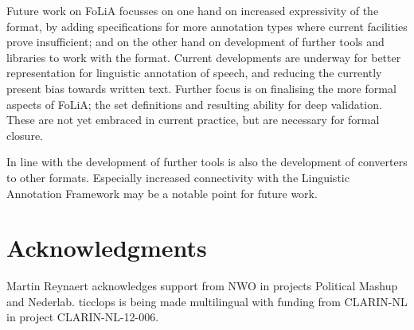 \documentclass[a4paper,10pt,twoside]{article}
\begin{document}
Future work on FoLiA focusses on one hand on increased expressivity of the
format, by adding specifications for more annotation types where current
facilities prove insufficient; and on the other hand on development of further
tools and libraries to work with the format. Current developments are
underway for better representation for linguistic annotation of speech, and
reducing the currently present bias towards written text. Further focus is on
finalising the more formal aspects of FoLiA; the set definitions and resulting
ability for deep validation. These are not yet embraced in current practice,
but are necessary for formal closure.

In line with the development of further tools is also the development of
converters to other formats. Especially increased connectivity with the
Linguistic Annotation Framework may be a notable point for future work.

\section{Acknowledgments}
Martin Reynaert acknowledges support from NWO in projects Political Mashup and Nederlab.
 {\sc ticcl}ops is being made multilingual with funding from CLARIN-NL in project CLARIN-NL-12-006.

 
  
\end{document}
